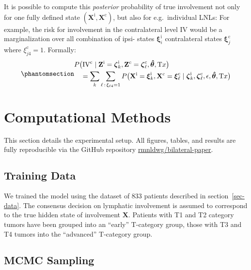 \documentclass[
  sn-mathphys-num,
]{sn-jnl}
\begin{document}
It is possible to compute this \emph{posterior} probability of true
involvement not only for one fully defined state
\((\mathbf{X}^\text{i}, \mathbf{X}^\text{c})\), but also for
e.g.~individual LNLs: For example, the risk for involvement in the
contralateral level IV would be a marginalization over all combination
of ipsi- states \(\boldsymbol{\xi}^\text{i}_i\) contralateral states
\(\boldsymbol{\xi}^\text{c}_j\) where \(\xi^\text{c}_{j4}=1\). Formally:
%
\begin{equation}\phantomsection\label{eq-marg-over-posterior}{
\begin{multlined}
P \big( \text{IV}^\text{c} \mid \mathbf{Z}^\text{i}=\boldsymbol{\zeta}^\text{i}_k, \mathbf{Z}^\text{c}=\boldsymbol{\zeta}^\text{c}_\ell, \boldsymbol{\hat{\theta}}, \text{T}x \big) \\
= \sum_k \sum_{\ell \, : \, \xi_{\ell 4}=1} P \big( \mathbf{X}^\text{i} = \boldsymbol{\xi}^\text{i}_k, \mathbf{X}^\text{c} = \boldsymbol{\xi}^\text{c}_\ell \mid \boldsymbol{\zeta}^\text{i}_k, \boldsymbol{\zeta}^\text{c}_\ell, \epsilon, \boldsymbol{\hat{\theta}}, \text{T}x \big)
\end{multlined}
}\end{equation}

\section{Computational Methods}\label{sec-methods}

This section details the experimental setup. All figures, tables, and
results are fully reproducible via the GitHub repository
\href{https://github.com/rmnldwg/bilateral-paper}{rmnldwg/bilateral-paper}.

\subsection{Training Data}\label{sec-training-data}

We trained the model using the dataset of 833 patients described in
section~\ref{sec-data}. The consensus decision on lymphatic involvement
is assumed to correspond to the true hidden state of involvement
\(\mathbf{X}\). Patients with T1 and T2 category tumors have been
grouped into an ``early'' T-category group, those with T3 and T4 tumors
into the ``advanced'' T-category group.

\subsection{MCMC Sampling}\label{sec-sampling}
\end{document}
